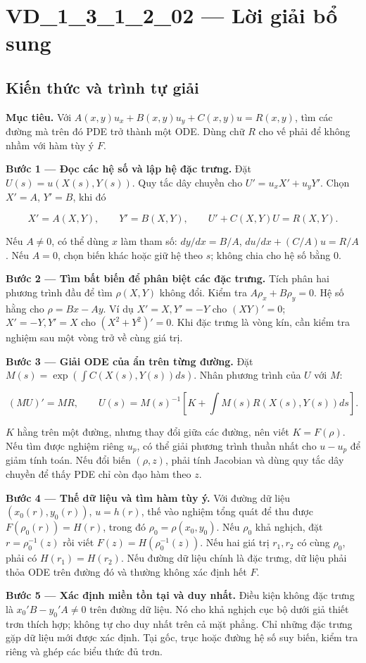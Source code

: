 \documentclass[10pt,a4paper]{article}
\begin{document}
\section*{VD\_1\_3\_1\_2\_02 — Lời giải bổ sung}
\subsection*{Kiến thức và trình tự giải}
\textbf{Mục tiêu.} Với $A(x,y)u_x+B(x,y)u_y+C(x,y)u=R(x,y)$, tìm các đường mà trên đó PDE trở thành một ODE. Dùng chữ $R$ cho vế phải để không nhầm với hàm tùy ý $F$.

\textbf{Bước 1 — Đọc các hệ số và lập hệ đặc trưng.} Đặt $U(s)=u(X(s),Y(s))$. Quy tắc dây chuyền cho $U'=u_xX'+u_yY'$. Chọn $X'=A$, $Y'=B$, khi đó

\[
X'=A(X,Y),\qquad Y'=B(X,Y),\qquad U'+C(X,Y)U=R(X,Y).
\]

Nếu $A\ne0$, có thể dùng $x$ làm tham số: $dy/dx=B/A$, $du/dx+(C/A)u=R/A$. Nếu $A=0$, chọn biến khác hoặc giữ hệ theo $s$; không chia cho hệ số bằng 0.

\textbf{Bước 2 — Tìm bất biến để phân biệt các đặc trưng.} Tích phân hai phương trình đầu để tìm $\rho(X,Y)$ không đổi. Kiểm tra $A\rho_x+B\rho_y=0$. Hệ số hằng cho $\rho=Bx-Ay$. Ví dụ $X'=X,Y'=-Y$ cho $(XY)'=0$; $X'=-Y,Y'=X$ cho $(X^2+Y^2)'=0$. Khi đặc trưng là vòng kín, cần kiểm tra nghiệm sau một vòng trở về cùng giá trị.

\textbf{Bước 3 — Giải ODE của ẩn trên từng đường.} Đặt $M(s)=\exp(\int C(X(s),Y(s))ds)$. Nhân phương trình của $U$ với $M$:

\[
(MU)'=MR,\qquad
U(s)=M(s)^{-1}\left[K+\int M(s)R(X(s),Y(s))ds\right].
\]

$K$ hằng trên một đường, nhưng thay đổi giữa các đường, nên viết $K=F(\rho)$. Nếu tìm được nghiệm riêng $u_p$, có thể giải phương trình thuần nhất cho $u-u_p$ để giảm tính toán. Nếu đổi biến $(\rho,z)$, phải tính Jacobian và dùng quy tắc dây chuyền để thấy PDE chỉ còn đạo hàm theo $z$.

\textbf{Bước 4 — Thế dữ liệu và tìm hàm tùy ý.} Với đường dữ liệu $(x_0(r),y_0(r))$, $u=h(r)$, thế vào nghiệm tổng quát để thu được $F(\rho_0(r))=H(r)$, trong đó $\rho_0=\rho(x_0,y_0)$. Nếu $\rho_0$ khả nghịch, đặt $r=\rho_0^{-1}(z)$ rồi viết $F(z)=H(\rho_0^{-1}(z))$. Nếu hai giá trị $r_1,r_2$ có cùng $\rho_0$, phải có $H(r_1)=H(r_2)$. Nếu đường dữ liệu chính là đặc trưng, dữ liệu phải thỏa ODE trên đường đó và thường không xác định hết $F$.

\textbf{Bước 5 — Xác định miền tồn tại và duy nhất.} Điều kiện không đặc trưng là $x_0'B-y_0'A\ne0$ trên đường dữ liệu. Nó cho khả nghịch cục bộ dưới giả thiết trơn thích hợp; không tự cho duy nhất trên cả mặt phẳng. Chỉ những đặc trưng gặp dữ liệu mới được xác định. Tại gốc, trục hoặc đường hệ số suy biến, kiểm tra riêng và ghép các biểu thức đủ trơn.
\end{document}
